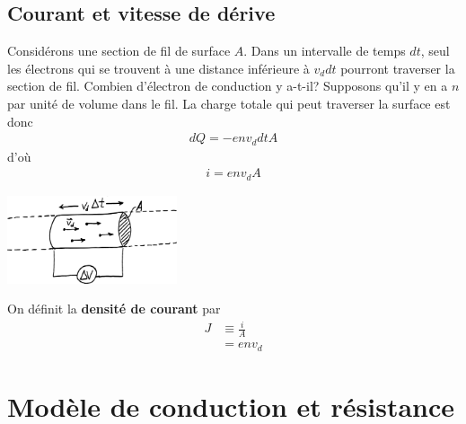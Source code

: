 \subsection{Courant et vitesse de dérive}

Considérons une section de fil de surface $A$. Dans un intervalle de temps
$dt$, seul les électrons qui se trouvent à une distance inférieure à $v_d
dt$ pourront traverser la section de fil. Combien d'électron de
conduction y a-t-il?
Supposons qu'il y en a $n$ par unité de volume dans le fil. La charge totale
qui peut traverser la surface est donc
\begin{align*}
  dQ = -env_ddt A
\end{align*}
d'où
\begin{align*}
  i = env_d A
\end{align*}

\begin{center}
  \includegraphics[width=5cm]{06-courant/figures/courant-vd.pdf}
\end{center}

On définit la \textbf{densité de courant} par
\begin{align*}
  J &\equiv \frac{i}{A} \\
    &= env_d
\end{align*}



\section{Modèle de conduction et résistance}

